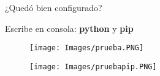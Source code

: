 \begin{frame}[t]{¿Quedó bien configurado?}\vspace{10pt}

Escribe en consola: \textbf{python} y \textbf{pip}
\begin{figure}
		\texttt{[image: Images/prueba.PNG]}
\end{figure}

\begin{figure}
		\texttt{[image: Images/pruebapip.PNG]}
\end{figure}

\end{frame}